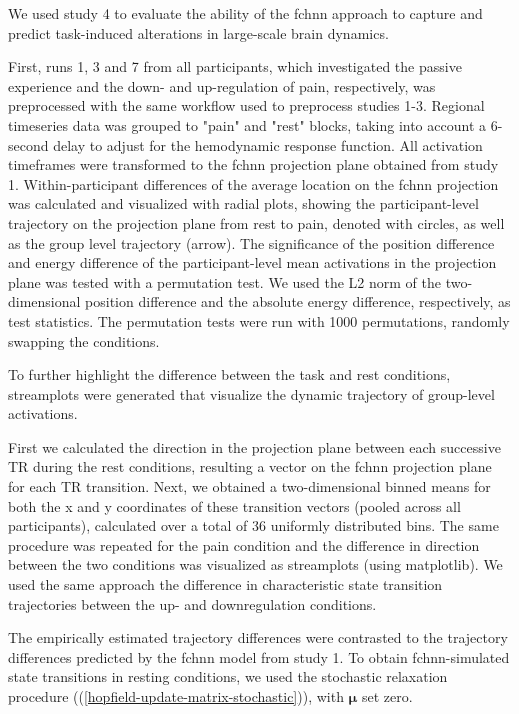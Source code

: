 \documentclass{article}
\begin{document}
We used study 4 to evaluate the ability of the \acrshort{fchnn} approach to capture and predict task-induced alterations in large-scale brain dynamics.

First, runs 1, 3 and 7 from all participants, which investigated the passive experience and the down- and up-regulation of pain, respectively, was preprocessed with the same workflow used to preprocess studies 1-3. Regional timeseries data was grouped to "pain" and "rest" blocks, taking into account a 6-second delay to adjust for the hemodynamic response function. All activation timeframes were transformed to the \acrshort{fchnn} projection plane obtained from study 1. Within-participant differences of the average location on the \acrshort{fchnn} projection was calculated and visualized with radial plots, showing the participant-level trajectory on the projection plane from rest to pain, denoted with circles, as well as the group level trajectory (arrow). The significance of the position difference and energy difference of the participant-level mean activations in the projection plane was tested with a permutation test. We used the L2 norm of the two-dimensional position difference and the absolute energy difference, respectively, as test statistics. The permutation tests were run with 1000 permutations, randomly swapping the conditions.

To further highlight the difference between the task and rest conditions, streamplots were generated that visualize the dynamic trajectory of group-level activations.

First we calculated the direction in the projection plane between each successive TR during the rest conditions, resulting a vector on the \acrshort{fchnn} projection plane for each TR transition.
Next, we obtained a two-dimensional binned means for both the x and y coordinates of these transition vectors (pooled across all participants), calculated over a total of 36 uniformly distributed bins.
The same procedure was repeated for the pain condition and the difference in direction between the two conditions was visualized as streamplots (using matplotlib).
We used the same approach the difference in characteristic state transition trajectories between the up- and downregulation conditions.

The empirically estimated trajectory differences were contrasted to the trajectory differences predicted by the \acrshort{fchnn} model from study 1.
To obtain \acrshort{fchnn}-simulated state transitions in resting conditions, we used the stochastic relaxation procedure ((\ref{hopfield-update-matrix-stochastic})), with $\mathbf{\mu}$ set zero.
\end{document}
